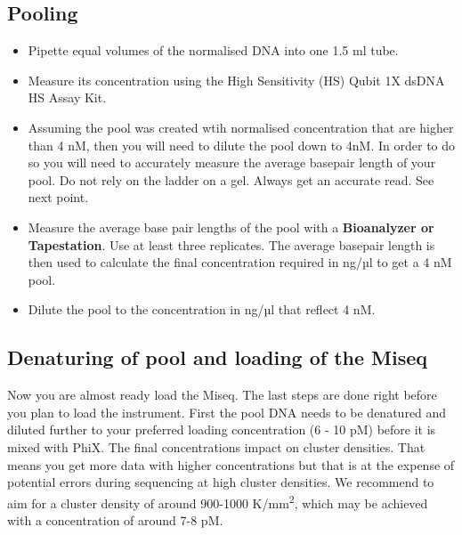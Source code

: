\documentclass[
]{book}
\begin{document}
\hypertarget{pooling}{%
\subsection{Pooling}\label{pooling}}

\begin{itemize}
\item
  Pipette equal volumes of the normalised DNA into one 1.5 ml tube.\\
\item
  Measure its concentration using the High Sensitivity (HS) Qubit 1X dsDNA HS Assay Kit.\\
\item
  Assuming the pool was created wtih normalised concentration that are higher than 4 nM, then you will need to dilute the pool down to 4nM. In order to do so you will need to accurately measure the average basepair length of your pool. Do not rely on the ladder on a gel. Always get an accurate read. See next point.\\
\item
  Measure the average base pair lengths of the pool with a \textbf{Bioanalyzer or Tapestation}. Use at least three replicates. The average basepair length is then used to calculate the final concentration required in ng/µl to get a 4 nM pool.\\
\item
  Dilute the pool to the concentration in ng/µl that reflect 4 nM.

  \hfill\break
\end{itemize}

\hypertarget{denaturing-of-pool-and-loading-of-the-miseq}{%
\subsection{Denaturing of pool and loading of the Miseq}\label{denaturing-of-pool-and-loading-of-the-miseq}}

Now you are almost ready load the Miseq. The last steps are done right before you plan to load the instrument. First the pool DNA needs to be denatured and diluted further to your preferred loading concentration (6 - 10 pM) before it is mixed with PhiX. The final concentrations impact on cluster densities. That means you get more data with higher concentrations but that is at the expense of potential errors during sequencing at high cluster densities. We recommend to aim for a cluster density of around 900-1000 K/mm\textsuperscript{2}, which may be achieved with a concentration of around 7-8 pM.
\end{document}
